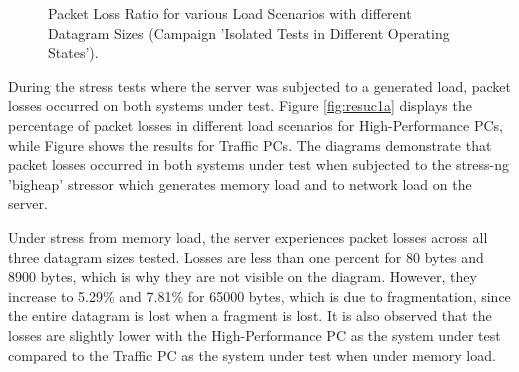 \begin{figure}[h!]
  \centering
  \caption{Packet Loss Ratio for various Load Scenarios with different Datagram Sizes (Campaign 'Isolated Tests in Different Operating States').}
  \label{fig:resuc1}
\end{figure}

During the stress tests where the server was subjected to a generated load, packet losses occurred on both systems under test. Figure \ref{fig:resuc1a} displays the percentage of packet losses in different load scenarios for High-Performance PCs, while Figure \label{fig:resuc1b} shows the results for Traffic PCs. The diagrams demonstrate that packet losses occurred in both systems under test when subjected to the stress-ng 'bigheap' stressor which generates memory load and to network load on the server.

Under stress from memory load, the server experiences packet losses across all three datagram sizes tested. Losses are less than one percent for 80 bytes and 8900 bytes, which is why they are not visible on the diagram. However, they increase to 5.29\% and 7.81\% for 65000 bytes, which is due to fragmentation, since the entire datagram is lost when a fragment is lost. It is also observed that the losses are slightly lower with the High-Performance PC as the system under test compared to the Traffic PC as the system under test when under memory load.

